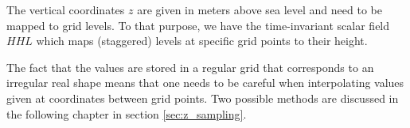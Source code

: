 The vertical coordinates $z$ are given in meters above sea level and need to be mapped to grid levels. To that purpose, we have the time-invariant scalar field $HHL$ which maps (staggered) levels at specific grid points to their height.

The fact that the values are stored in a regular grid that corresponds to an irregular real shape means that one needs to be careful when interpolating values given at coordinates between grid points. Two possible methods are discussed in the following chapter in section \ref{sec:z_sampling}.



